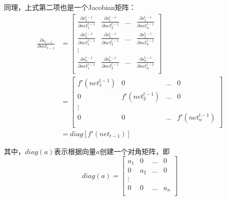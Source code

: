 同理，上式第二项也是一个Jacobian矩阵：
\begin{align*}
	\frac{\partial{{s}_{t-1}}}{\partial{{net}_{t-1}}} & =
	\begin{bmatrix}
		\frac{\partial{s_1^{t-1}}}{\partial{net_1^{t-1}}} & \frac{\partial{s_1^{t-1}}}{\partial{net_2^{t-1}}} & ... & \frac{\partial{s_1^{t-1}}}{\partial{net_n^{t-1}}} \\
		\frac{\partial{s_2^{t-1}}}{\partial{net_1^{t-1}}} & \frac{\partial{s_2^{t-1}}}{\partial{net_2^{t-1}}} & ... & \frac{\partial{s_2^{t-1}}}{\partial{net_n^{t-1}}} \\
		\vdots                                                                                                                                                          \\
		\frac{\partial{s_n^{t-1}}}{\partial{net_1^{t-1}}} & \frac{\partial{s_n^{t-1}}}{\partial{net_2^{t-1}}} & ... & \frac{\partial{s_n^{t-1}}}{\partial{net_n^{t-1}}} \\
	\end{bmatrix}                                                      \\
	                                                  & =\begin{bmatrix}
		f'(net_1^{t-1}) & 0               & ... & 0               \\
		0               & f'(net_2^{t-1}) & ... & 0               \\
		\vdots                                                    \\
		0               & 0               & ... & f'(net_n^{t-1}) \\
	\end{bmatrix} \\
	                                                  & =diag[f'({net}_{t-1})]
\end{align*}


其中，$diag({a})$表示根据向量$a$创建一个对角矩阵，即
\[
	diag({a})=\begin{bmatrix}
		a_1 & 0   & ... & 0   \\
		0   & a_2 & ... & 0   \\
		\vdots                \\
		0   & 0   & ... & a_n \\
	\end{bmatrix}
\]

